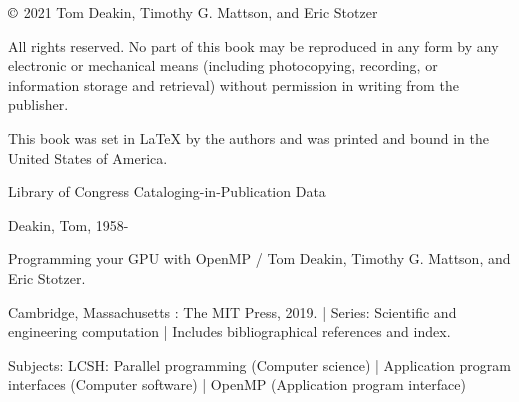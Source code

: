 \newpage
{\footnotesize  %
\raggedright
\thispagestyle{empty}
\noindent
\(\copyright\) 2021 Tom Deakin, Timothy G. Mattson, and Eric Stotzer
 
\vspace{13pt}
\noindent
All rights reserved. No part of this book may be reproduced in any form by any 
electronic or mechanical means (including photocopying, recording, or information 
storage and retrieval) without permission in writing from the publisher.
 
\vspace{13pt}
\noindent
This book was set in {\LaTeX} by the authors and was
printed and bound in the United States of America.


\vspace{13pt}
Library of Congress Cataloging-in-Publication Data

\vspace{13pt}

Deakin, Tom, 1958- 

Programming your GPU with OpenMP / Tom Deakin, Timothy G. 
Mattson, and Eric Stotzer.  
   

Cambridge, Massachusetts : The MIT Press, 2019. | Series: 
Scientific and engineering computation | Includes bibliographical 
references and index. 
   

Subjects: LCSH: Parallel programming (Computer science) | Application 
program interfaces (Computer software) | OpenMP (Application program 
interface) 





\vspace{13pt}
 
\vspace{13pt}
\noindent


}
